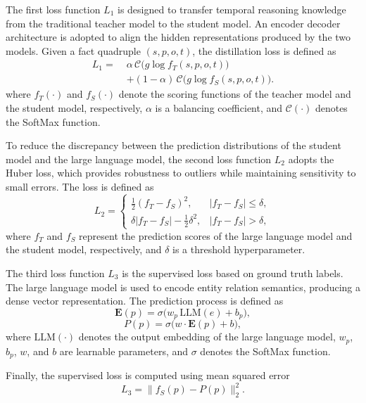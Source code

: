 \documentclass[11pt]{article}
\begin{document}
The first loss function $L_1$ is designed to transfer temporal reasoning knowledge from the traditional teacher model to the student model. An encoder decoder architecture is adopted to align the hidden representations produced by the two models. Given a fact quadruple $(s, p, o, t)$, the distillation loss is defined as
\begin{align}
L_1 =\;& \alpha \, \mathcal{C}\big(g \log f_T(s, p, o, t)\big) \nonumber \\
& + (1 - \alpha)\, \mathcal{C}\big(g \log f_S(s, p, o, t)\big).
\end{align}
where $f_T(\cdot)$ and $f_S(\cdot)$ denote the scoring functions of the teacher model and the student model, respectively, $\alpha$ is a balancing coefficient, and $\mathcal{C}(\cdot)$ denotes the SoftMax function.

To reduce the discrepancy between the prediction distributions of the student model and the large language model, the second loss function $L_2$ adopts the Huber loss, which provides robustness to outliers while maintaining sensitivity to small errors. The loss is defined as
\begin{equation}
L_2 =
\begin{cases}
\frac{1}{2} (f_T - f_S)^2, & |f_T - f_S| \le \delta, \\
\delta |f_T - f_S| - \frac{1}{2} \delta^2, & |f_T - f_S| > \delta,
\end{cases}
\end{equation}
where $f_T$ and $f_S$ represent the prediction scores of the large language model and the student model, respectively, and $\delta$ is a threshold hyperparameter.

The third loss function $L_3$ is the supervised loss based on ground truth labels. The large language model is used to encode entity relation semantics, producing a dense vector representation. The prediction process is defined as
\begin{equation}
\mathbf{E}(p) = \sigma\big(w_p \, \text{LLM}(e) + b_p\big),
\end{equation}
\begin{equation}
P(p) = \sigma\big(w \cdot \mathbf{E}(p) + b\big),
\end{equation}
where $\text{LLM}(\cdot)$ denotes the output embedding of the large language model, $w_p$, $b_p$, $w$, and $b$ are learnable parameters, and $\sigma$ denotes the SoftMax function.

Finally, the supervised loss is computed using mean squared error
\begin{equation}
L_3 = \| f_S(p) - P(p) \|_2^2 .
\end{equation}
\end{document}
